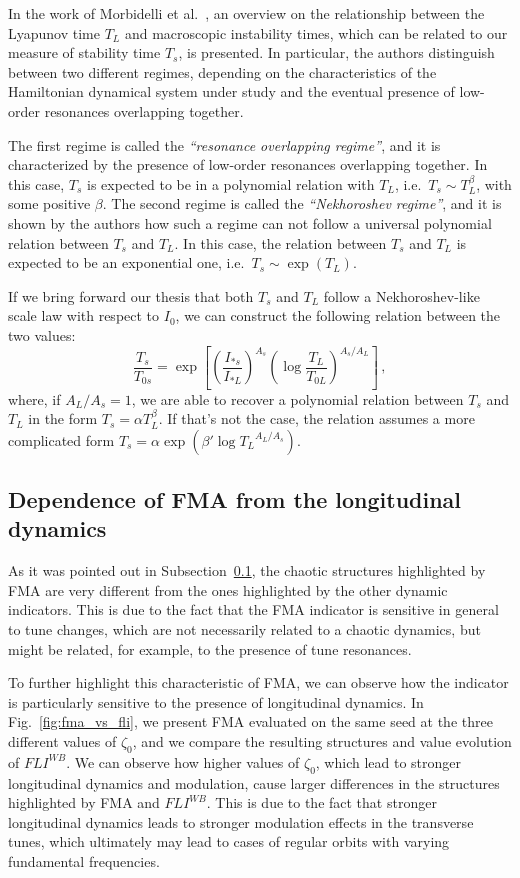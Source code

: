 In the work of Morbidelli et al.~\cite{Morbidelli1995}, an overview on the relationship between the Lyapunov time $T_L$ and macroscopic instability times, which can be related to our measure of stability time $T_s$, is presented. In particular, the authors distinguish between two different regimes, depending on the characteristics of the Hamiltonian dynamical system under study and the eventual presence of low-order resonances overlapping together.

The first regime is called the \textit{``resonance overlapping regime''}, and it is characterized by the presence of low-order resonances overlapping together. In this case, $T_s$ is expected to be in a polynomial relation with $T_L$, i.e.\ $T_s \sim T_L^\beta$, with some positive $\beta$. The second regime is called the \textit{``Nekhoroshev regime''}, and it is shown by the authors how such a regime can not follow a universal polynomial relation between $T_s$ and $T_L$. In this case, the relation between $T_s$ and $T_L$ is expected to be an exponential one, i.e.\ $T_s \sim \exp(T_L)$.

If we bring forward our thesis that both $T_s$ and $T_L$ follow a Nekhoroshev-like scale law with respect to $I_0$, we can construct the following relation between the two values:
\begin{equation}
    \frac{T_s}{T_{0s}} = \exp\left[\left(\frac{I_{\ast s}}{I_{\ast L}}\right)^{A_s}\left(\log\frac{T_L}{T_{0L}}\right)^{A_s / A_L}\right] \, ,
\end{equation}
where, if $A_L/A_s = 1$, we are able to recover a polynomial relation between $T_s$ and $T_L$ in the form $T_s = \alpha T_L^\beta$. If that's not the case, the relation assumes a more complicated form $T_s = \alpha \exp(\beta' \log{T_L}^{A_L/A_s})$.


\subsection{Dependence of FMA from the longitudinal dynamics}

As it was pointed out in Subsection~\ref{}, the chaotic structures highlighted by FMA are very different from the ones highlighted by the other dynamic indicators. This is due to the fact that the FMA indicator is sensitive in general to tune changes, which are not necessarily related to a chaotic dynamics, but might be related, for example, to the presence of tune resonances.

To further highlight this characteristic of FMA, we can observe how the indicator is particularly sensitive to the presence of longitudinal dynamics. In Fig.~\ref{fig:fma_vs_fli}, we present FMA evaluated on the same seed at the three different values of $\zeta_0$, and we compare the resulting structures and value evolution of $FLI^{WB}$. We can observe how higher values of $\zeta_0$, which lead to stronger longitudinal dynamics and modulation, cause larger differences in the structures highlighted by FMA and $FLI^{WB}$. This is due to the fact that stronger longitudinal dynamics leads to stronger modulation effects in the transverse tunes, which ultimately may lead to cases of regular orbits with varying fundamental frequencies.   

